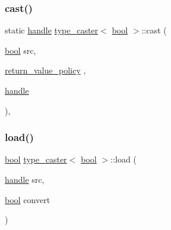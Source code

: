 \subsubsection{\texorpdfstring{cast()}{cast()}}
{\footnotesize\ttfamily static \mbox{\hyperlink{classhandle}{handle}} \mbox{\hyperlink{classtype__caster}{type\+\_\+caster}}$<$ \mbox{\hyperlink{asdl_8h_af6a258d8f3ee5206d682d799316314b1}{bool}} $>$\+::cast (\begin{DoxyParamCaption}\item[{\mbox{\hyperlink{asdl_8h_af6a258d8f3ee5206d682d799316314b1}{bool}}}]{src,  }\item[{\mbox{\hyperlink{detail_2common_8h_adde72ab1fb0dd4b48a5232c349a53841}{return\+\_\+value\+\_\+policy}}}]{,  }\item[{\mbox{\hyperlink{classhandle}{handle}}}]{ }\end{DoxyParamCaption})\hspace{0.3cm}{\ttfamily [inline]}, {\ttfamily [static]}}

\mbox{\label{classtype__caster_3_01bool_01_4_a5559d4f858c9ab329b7112fe2cd1d6ff}} 
\subsubsection{\texorpdfstring{load()}{load()}}
{\footnotesize\ttfamily \mbox{\hyperlink{asdl_8h_af6a258d8f3ee5206d682d799316314b1}{bool}} \mbox{\hyperlink{classtype__caster}{type\+\_\+caster}}$<$ \mbox{\hyperlink{asdl_8h_af6a258d8f3ee5206d682d799316314b1}{bool}} $>$\+::load (\begin{DoxyParamCaption}\item[{\mbox{\hyperlink{classhandle}{handle}}}]{src,  }\item[{\mbox{\hyperlink{asdl_8h_af6a258d8f3ee5206d682d799316314b1}{bool}}}]{convert }\end{DoxyParamCaption})\hspace{0.3cm}{\ttfamily [inline]}}

\mbox{\label{classtype__caster_3_01bool_01_4_a0c24496979fb382a33a317d3d2e66aa6}} 
